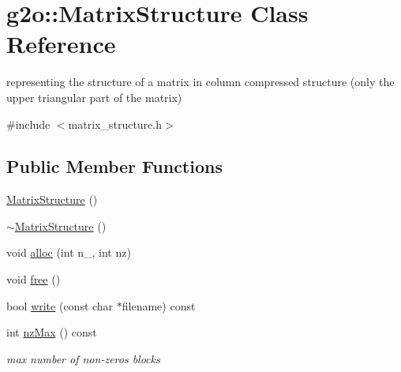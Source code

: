 \hypertarget{classg2o_1_1_matrix_structure}{}\section{g2o\+:\+:Matrix\+Structure Class Reference}
\label{classg2o_1_1_matrix_structure}


representing the structure of a matrix in column compressed structure (only the upper triangular part of the matrix)  




{\ttfamily \#include $<$matrix\+\_\+structure.\+h$>$}

\subsection*{Public Member Functions}
\begin{DoxyCompactItemize}
\item 
\mbox{\hyperlink{classg2o_1_1_matrix_structure_aa016529c47ff242c5547301041360b5e}{Matrix\+Structure}} ()
\item 
\mbox{\hyperlink{classg2o_1_1_matrix_structure_a64d784cf6c4415145e012368ec4d42c1}{$\sim$\+Matrix\+Structure}} ()
\item 
void \mbox{\hyperlink{classg2o_1_1_matrix_structure_aeda2f4fd97499545773af331cd2c10f2}{alloc}} (int n\+\_\+, int nz)
\item 
void \mbox{\hyperlink{classg2o_1_1_matrix_structure_a4bc9281fa8ae82dab908506fe0819498}{free}} ()
\item 
bool \mbox{\hyperlink{classg2o_1_1_matrix_structure_a10f96bf6fbe278620b5507fb5b18cfdd}{write}} (const char $\ast$filename) const
\item 
int \mbox{\hyperlink{classg2o_1_1_matrix_structure_ae44849701c44a9327ec5ff736d5eb54b}{nz\+Max}} () const
\begin{DoxyCompactList}\small\item\em max number of non-\/zeros blocks \end{DoxyCompactList}\end{DoxyCompactItemize}
